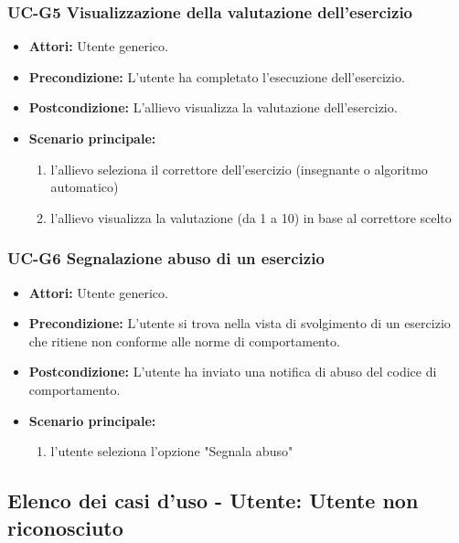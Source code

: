 	\subsubsection{UC-G5 Visualizzazione della valutazione dell'esercizio}
	\begin{itemize}
			\item \textbf{Attori:} Utente generico.
			\item \textbf{Precondizione:} L'utente ha completato l'esecuzione dell'esercizio.
			\item \textbf{Postcondizione:} L'allievo visualizza la valutazione dell'esercizio.
			\item \textbf{Scenario principale:}
				\begin{enumerate}
					\item l'allievo seleziona il correttore dell'esercizio (insegnante o algoritmo automatico)
					\item l'allievo visualizza la valutazione (da 1 a 10) in base al correttore scelto
				\end{enumerate}
	\end{itemize}				

\subsubsection{UC-G6 Segnalazione abuso di un esercizio}
	\begin{itemize}
		\item \textbf{Attori:} Utente generico.
		\item \textbf{Precondizione:} L'utente si trova nella vista di svolgimento di un esercizio che ritiene non conforme alle norme di comportamento.
		\item \textbf{Postcondizione:} L'utente ha inviato una notifica di abuso del codice di comportamento.
		\item \textbf{Scenario principale:}
		\begin{enumerate}
			\item l'utente seleziona l'opzione "Segnala abuso"
		\end{enumerate}
	\end{itemize}
	
	

\subsection{Elenco dei casi d'uso - Utente: Utente non riconosciuto}

